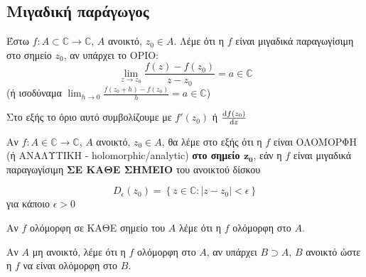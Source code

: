 \documentclass[12pt,a4paper,notitlepage,fleqn]{article}
\begin{document}
    \subsection{Μιγαδική παράγωγος}
    \begin{defn*}{}
       	Έστω \( f:A \subset \mathbb C \to \mathbb C  \), \( A \) ανοικτό,
       	\( z_0 \in A \). Λέμε ότι η \( f \) είναι μιγαδικά παραγωγίσιμη στο σημείο
       	\( z_0 \), αν υπάρχει το ΟΡΙΟ:
       	\[
       	\lim_{z\to z_0}
       	\frac{f(z)-f(z_0)}{z-z_0} = a \in \mathbb C
       	\]
       	(ή ισοδύναμα \( \lim_{h\to0}\frac{f(z_0+h)-f(z_0)}{h}=a\in\mathbb C \))

       	Στο εξής το όριο αυτό συμβολίζουμε με \( f'(z_0) \) ή
       	\( \od{f(z_0)}{z} \)
    \end{defn*}
    \begin{defn*}{}
       	Αν \( f:A\in\mathbb C\to\mathbb C \), \( A \) ανοικτό, \( z_0\in A \),
       	θα λέμε στο εξής ότι η \( f \) είναι ΟΛΟΜΟΡΦΗ (ή ΑΝΑΛΥΤΙΚΗ -
       	holomorphic/analytic)
       	\textbf{στο σημείο \( \mathbf{z_0} \)}, εάν η \( f \) είναι μιγαδικά
       	παραγωγίσιμη \textbf{ΣΕ ΚΑΘΕ ΣΗΜΕΙΟ} του ανοικτού δίσκου
       	\[
       	D_\epsilon(z_0) = \left\lbrace
       	z\in\mathbb C: |z-z_0|<\epsilon
       	\right\rbrace
       	\]
       	για κάποιο \( \epsilon>0 \)
    \end{defn*}

    Αν \( f \) ολόμορφη σε ΚΑΘΕ σημείο του \( A \) λέμε ότι η \( f \) ολόμορφη στο
    \( A \).

    \begin{defn*}{}
       	Αν \( A \) μη ανοικτό, λέμε ότι η \( f \) ολόμορφη στο \( A \), αν
       	υπάρχει \( B \supset A \), \( B \) ανοικτό ώστε η \( f \) να είναι ολόμορφη στο \( B \).
    \end{defn*}
\end{document}
